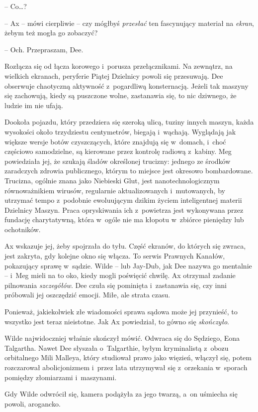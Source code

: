 \documentclass[oneside,polish,11pt,sfheadings]{mwbk}
\begin{document}
-- Co\ldots?

-- Ax -- mówi cierpliwie -- czy mógłbyś \emph{przesłać }ten fascynujący
materiał na \emph{ekran}, żebym też mogła go zobaczyć?

-- Och. Przepraszam, Dee.

Rozłącza się od łącza korowego i~porusza przełącznikami. Na zewnątrz, na
wielkich ekranach, peryferie Piątej Dzielnicy powoli się przesuwają. Dee
obserwuje chaotyczną aktywność z~pogardliwą konsternacją. Jeżeli tak
maszyny się zachowują, kiedy są puszczone wolne, zastanawia się, to nic
dziwnego, że ludzie im nie ufają.

Dookoła pojazdu, który przedziera się szeroką ulicą, tuziny innych
maszyn, każda wysokości około trzydziestu centymetrów, biegają i~wąchają. Wyglądają jak większe wersje botów czyszczących, które znajdują
się w~domach, i~choć częściowo samodzielne, są kierowane przez kontrolę
radiową z~kabiny. Meg powiedziała jej, że szukają śladów określonej
trucizny: jednego ze środków zaradczych zdrowia publicznego, którym to
miejsce jest okresowo bombardowane. Trucizna, ogólnie znana jako
Niebieski Glut, jest nanotechnologicznym równoważnikiem wirusów,
regularnie aktualizowanych i~mutowanych, by utrzymać tempo z~podobnie
ewoluującym dzikim życiem inteligentnej materii Dzielnicy Maszyn. Praca
opryskiwania ich z~powietrza jest wykonywana przez fundację
charytatywną, która w~ogóle nie ma kłopotu w~zbiórce pieniędzy lub
ochotników.

Ax wskazuje jej, żeby spojrzała do tyłu. Część ekranów, do których się
zwraca, jest zakryta, gdy kolejne okno się włącza. To serwis Prawnych
Kanałów, pokazujący sprawę w~sądzie. Wilde -- lub Jay-Dub, jak Dee nazywa
go mentalnie -- i~Meg mieli na to oko, kiedy mogli poświęcić chwilę. Ax
otrzymał zadanie pilnowania \emph{szczegółów}. Dee czuła się pominięta i~zastanawia się, czy inni próbowali jej oszczędzić emocji. Miłe, ale
strata czasu.

Ponieważ, jakiekolwiek złe wiadomości sprawa sądowa może jej przynieść,
to wszystko jest teraz nieistotne. Jak Ax powiedział, to gówno się
\emph{skończyło}.

Wilde najwidoczniej właśnie skończył mówić. Odwraca się do Sędziego,
Eona Talgartha. Nawet Dee słyszała o~Talgarthie, byłym kryminalistą z~obozu orbitalnego Mili Malleya, który studiował prawo jako więzień,
włączył się, potem rozczarował abolicjonizmem i~przez lata utrzymywał
się z~orzekania w~sporach pomiędzy złomiarzami i~maszynami.

Gdy Wilde odwrócił się, kamera podążyła za jego twarzą, a~on uśmiecha
się powoli, arogancko.
\end{document}
